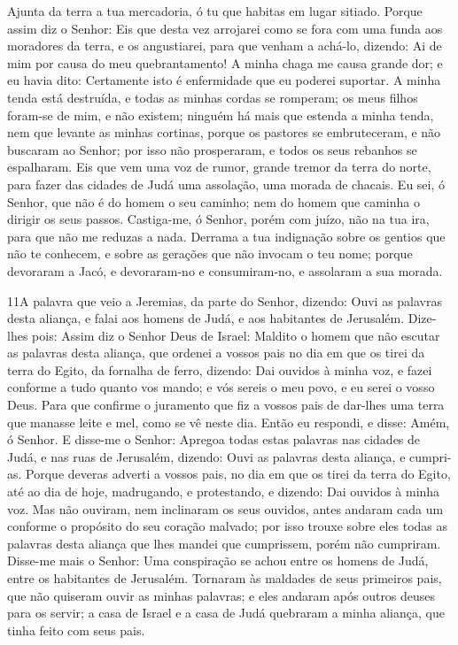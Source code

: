 Ajunta da terra a tua mercadoria, ó tu que habitas em lugar
sitiado. Porque assim diz o Senhor: Eis que desta vez
arrojarei como se fora com uma funda aos moradores da terra, e os
angustiarei, para que venham a achá-lo, dizendo: Ai de mim
por causa do meu quebrantamento! A minha chaga me causa grande dor;
e eu havia dito: Certamente isto é enfermidade que eu poderei
suportar. A minha tenda está destruída, e todas as minhas
cordas se romperam; os meus filhos foram-se de mim, e não existem;
ninguém há mais que estenda a minha tenda, nem que levante as minhas
cortinas, porque os pastores se embruteceram, e não buscaram
ao Senhor; por isso não prosperaram, e todos os seus rebanhos se
espalharam. Eis que vem uma voz de rumor, grande tremor da
terra do norte, para fazer das cidades de Judá uma assolação, uma
morada de chacais. Eu sei, ó Senhor, que não é do homem o seu
caminho; nem do homem que caminha o dirigir os seus passos.
Castiga-me, ó Senhor, porém com juízo, não na tua ira, para
que não me reduzas a nada. Derrama a tua indignação sobre os
gentios que não te conhecem, e sobre as gerações que não invocam o
teu nome; porque devoraram a Jacó, e devoraram-no e consumiram-no, e
assolaram a sua morada.

\medskip

\lettrine{11} A palavra que veio a Jeremias, da parte do
Senhor, dizendo: Ouvi as palavras desta aliança, e falai aos
homens de Judá, e aos habitantes de Jerusalém. Dize-lhes pois:
Assim diz o Senhor Deus de Israel: Maldito o homem que não escutar
as palavras desta aliança, que ordenei a vossos pais no dia em
que os tirei da terra do Egito, da fornalha de ferro, dizendo: Dai
ouvidos à minha voz, e fazei conforme a tudo quanto vos mando; e vós
sereis o meu povo, e eu serei o vosso Deus. Para que confirme o
juramento que fiz a vossos pais de dar-lhes uma terra que manasse
leite e mel, como se vê neste dia. Então eu respondi, e disse: Amém,
ó Senhor. E disse-me o Senhor: Apregoa todas estas palavras nas
cidades de Judá, e nas ruas de Jerusalém, dizendo: Ouvi as palavras
desta aliança, e cumpri-as. Porque deveras adverti a vossos
pais, no dia em que os tirei da terra do Egito, até ao dia de hoje,
madrugando, e protestando, e dizendo: Dai ouvidos à minha voz.
Mas não ouviram, nem inclinaram os seus ouvidos, antes andaram
cada um conforme o propósito do seu coração malvado; por isso trouxe
sobre eles todas as palavras desta aliança que lhes mandei que
cumprissem, porém não cumpriram. Disse-me mais o Senhor: Uma
conspiração se achou entre os homens de Judá, entre os habitantes de
Jerusalém. Tornaram às maldades de seus primeiros pais, que
não quiseram ouvir as minhas palavras; e eles andaram após outros
deuses para os servir; a casa de Israel e a casa de Judá quebraram a
minha aliança, que tinha feito com seus pais.

